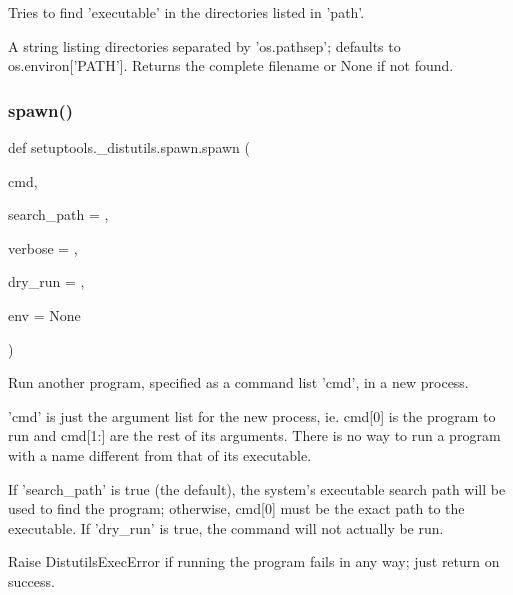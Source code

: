 \begin{DoxyVerb}Tries to find 'executable' in the directories listed in 'path'.

A string listing directories separated by 'os.pathsep'; defaults to
os.environ['PATH'].  Returns the complete filename or None if not found.
\end{DoxyVerb}
 \mbox{\label{namespacesetuptools_1_1__distutils_1_1spawn_a166195c57c6f48f22abaca8c8d386f43}} 
\subsubsection{\texorpdfstring{spawn()}{spawn()}}
{\footnotesize\ttfamily def setuptools.\+\_\+distutils.\+spawn.\+spawn (\begin{DoxyParamCaption}\item[{}]{cmd,  }\item[{}]{search\+\_\+path = {},  }\item[{}]{verbose = {},  }\item[{}]{dry\+\_\+run = {},  }\item[{}]{env = {\ttfamily None} }\end{DoxyParamCaption})}

\begin{DoxyVerb}Run another program, specified as a command list 'cmd', in a new process.

'cmd' is just the argument list for the new process, ie.
cmd[0] is the program to run and cmd[1:] are the rest of its arguments.
There is no way to run a program with a name different from that of its
executable.

If 'search_path' is true (the default), the system's executable
search path will be used to find the program; otherwise, cmd[0]
must be the exact path to the executable.  If 'dry_run' is true,
the command will not actually be run.

Raise DistutilsExecError if running the program fails in any way; just
return on success.
\end{DoxyVerb}
 